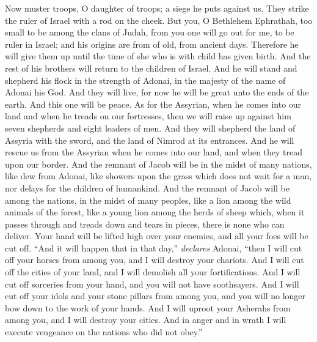 \begin{biblechapter} %
  Now muster troops, O daughter of troops; 
a siege he puts against us. 
They strike the ruler of Israel 
with a rod on the cheek.
\verse But you, O Bethlehem Ephrathah, 
too small to be among the clans of Judah, 
from you one will go out for me, 
to be ruler in Israel; 
and his origins are from of old, 
from ancient days.
\verse Therefore he will give them up 
until the time of she who is with child has given birth. 
And the rest of his brothers will return 
to the children of Israel.
\verse And he will stand and shepherd his flock 
in the strength of Adonai, 
in the majesty of the name of Adonai his God. 
And they will live, 
for now he will be great unto the ends of the earth.
\verse And this one will be peace. 
As for the Assyrian, when he comes into our land 
and when he treads on our fortresses, 
then we will raise up against him seven shepherds 
and eight leaders of men.
\verse And they will shepherd the land of Assyria with the sword, 
and the land of Nimrod at its entrances. 
And he will rescue us from the Assyrian 
when he comes into our land, 
and when they tread upon our border.
 And the remnant of Jacob will be 
in the midst of many nations, 
like dew from Adonai, 
like showers upon the grass 
which does not wait for a man, 
nor delays for the children of humankind.
\verse And the remnant of Jacob will be among the nations, 
in the midst of many peoples, 
like a lion among the wild animals of the forest, 
like a young lion among the herds of sheep 
which, when it passes through and treads down 
and tears in pieces, there is none who can deliver.
\verse Your hand will be lifted high over your enemies, 
and all your foes will be cut off.
\verse “And it will happen that in that day,” \textit{declares} Adonai, 
“then I will cut off your horses from among you, 
and I will destroy your chariots.
\verse And I will cut off the cities of your land, 
and I will demolish all your fortifications.
\verse And I will cut off sorceries from your hand, 
and you will not have soothsayers.
\verse And I will cut off your idols 
and your stone pillars from among you, 
and you will no longer bow down 
to the work of your hands.
\verse And I will uproot your Asherahs from among you, 
and I will destroy your cities.
\verse And in anger and in wrath I will execute vengeance 
on the nations who did not obey.”
\end{biblechapter}

